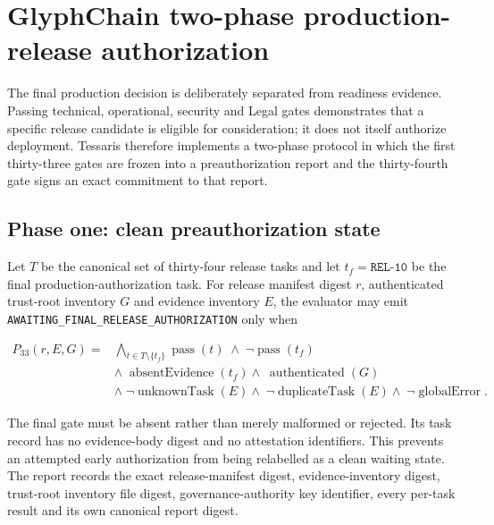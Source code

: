 \section{GlyphChain two-phase production-release authorization}
\label{sec:glyphchain-two-phase-release-authorization}

The final production decision is deliberately separated from readiness evidence.
Passing technical, operational, security and Legal gates demonstrates that a
specific release candidate is eligible for consideration; it does not itself
authorize deployment.  Tessaris therefore implements a two-phase protocol in
which the first thirty-three gates are frozen into a preauthorization report and
the thirty-fourth gate signs an exact commitment to that report.

\subsection{Phase one: clean preauthorization state}

Let $T$ be the canonical set of thirty-four release tasks and let
$t_f=\texttt{REL-10}$ be the final production-authorization task.  For release
manifest digest $r$, authenticated trust-root inventory $G$ and evidence inventory
$E$, the evaluator may emit
\texttt{AWAITING\_FINAL\_RELEASE\_AUTHORIZATION} only when

\begin{equation}
  \begin{split}
  P_{33}(r,E,G) ={}&
    \bigwedge_{t\in T\setminus\{t_f\}}\operatorname{pass}(t)
    \;\land\;\neg\operatorname{pass}(t_f) \\
    &\land\;\operatorname{absentEvidence}(t_f)
    \land\;\operatorname{authenticated}(G) \\
    &\land\;\neg\operatorname{unknownTask}(E)
    \land\;\neg\operatorname{duplicateTask}(E)
    \land\;\neg\operatorname{globalError}.
  \end{split}
\end{equation}

The final gate must be absent rather than merely malformed or rejected.  Its task
record has no evidence-body digest and no attestation identifiers.  This prevents
an attempted early authorization from being relabelled as a clean waiting state.
The report records the exact release-manifest digest, evidence-inventory digest,
trust-root inventory file digest, governance-authority key identifier, every
per-task result and its own canonical report digest.

